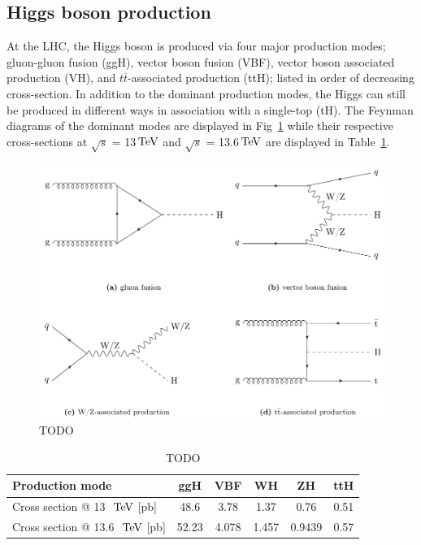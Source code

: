 \subsection{Higgs boson production}

At the \ac{LHC}, the Higgs boson is produced via four major production modes; gluon-gluon fusion (ggH), vector boson fusion (VBF), vector boson associated production (VH), and $t\overline{t}$-associated production (ttH); listed in order of decreasing cross-section. In addition to the dominant production modes, the Higgs can still be produced in different ways \eg in association with a single-top (tH). The Feynman diagrams of the dominant modes are displayed in Fig~\ref{Figure:Introduction_HiggsProductionModes} while their respective cross-sections at $\sqrt{s}$ = 13$\,\text{Te\hspace{-.08em}V}$ and $\sqrt{s}$ = 13.6$\,\text{Te\hspace{-.08em}V}$ are displayed in Table~\ref{Table:Introduction_HiggsProduction_XS}. 

\begin{figure}[h]
\centering
\includegraphics[width= .9\textwidth]{Figures/Introduction/Higgs_ProductionModes.png}
\caption{TODO}\label{Figure:Introduction_HiggsProductionModes}
\end{figure}

\begin{table}[h]
\centering
\begin{tabular}{l|c|c|c|c|c}
\hline
Production mode                   & ggH   & VBF   & WH    & ZH     & ttH  \\ \hline
Cross section @ 13~$\,\text{Te\hspace{-.08em}V}$ {[}pb{]}   & 48.6  & 3.78  & 1.37  & 0.76   & 0.51 \\
\hline
Cross section @ 13.6~$\,\text{Te\hspace{-.08em}V}$ {[}pb{]} & 52.23 & 4.078 & 1.457 & 0.9439 & 0.57
\end{tabular}
\caption{TODO \cite{HiggsProduction_XS}}
\label{Table:Introduction_HiggsProduction_XS}
\end{table}

